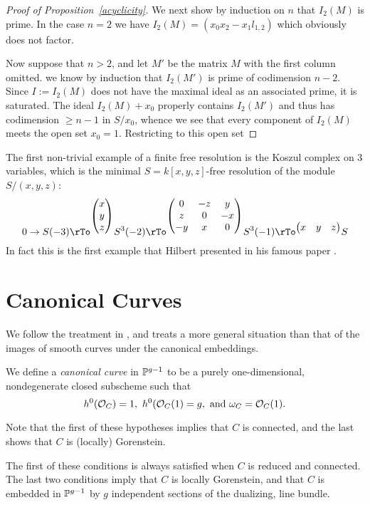 \begin{proof}[Proof of Proposition~\ref{acyclicity}]
We next show by induction on $n$ that  $I_{2}(M)$ is prime. In the case $n=2$ we have $I_{2}(M) =  (x_{0}x_{2}-x_{1}l_{1,2})$ which obviously does not factor. 

Now suppose that $n>2$, and let $M'$ be the matrix $M$ with the first column omitted. we know by induction that $I_{2}(M')$ is prime of codimension $n-2$. Since $I:=I_{2}(M)$ does not have the maximal ideal as an associated prime, it is saturated. The ideal $I_{2}(M)+x_{0}$ properly contains $I_{2}(M')$ and thus has codimension $\geq n-1$ in $S/x_{0}$, whence we see that every component of $I_{2}(M)$ meets the open set
$x_{0} = 1$. Restricting to this open set
\end{proof}


The first non-trivial example of a finite free resolution is the Koszul complex on 3 variables, which is the minimal $S = k[x,y,z]$-free resolution of the module $S/(x,y,z)$:
$$
0\to S(-3) \rTo^{
\begin{pmatrix}
x\\y\\z 
\end{pmatrix}}
 S^3(-2) \rTo^{\begin{pmatrix}
0&-z&y\\
z&0&-x\\
-y&x &0
\end{pmatrix}}
S^3(-1) \rTo^{
\begin{pmatrix}
x&y&z
\end{pmatrix}}
S
$$
In fact this is the first example that Hilbert presented in his famous paper \cite{}. 																											

\section{Canonical Curves}
We follow the treatment in \cite{Schreyer}, and treats a more general situation than that of the 
images of smooth curves under the canonical embeddings.

We define a \emph{canonical curve} in ${\mathbb P}^{g-1}$ to be a purely one-dimensional, nondegenerate closed subscheme  such that
$$
 h^{0}({\mathcal O}_{C}) = 1,\ h^{0}({\mathcal O}_{C}(1) = g, \hbox{ and } \omega_{C} = {\mathcal O}_{C}(1).
$$

Note that the first of these hypotheses implies that $C$ is connected, and the last shows that
$C$ is (locally) Gorenstein.

The first of these conditions is always satisfied when $C$ is reduced and connected. The last two conditions imply that $C$ is locally Gorenstein, and that $C$ is embedded in ${\mathbb P}^{g-1}$ by $g$ independent sections of the dualizing, line bundle.


